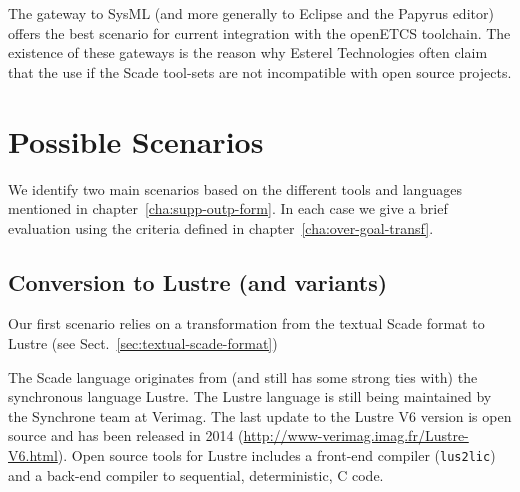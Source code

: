 \documentclass{template/openetcs_report}
\begin{document}
The gateway to SysML (and more generally to Eclipse and the Papyrus
editor) offers the best scenario for current integration with the
openETCS toolchain. The existence of these gateways is the reason why
Esterel Technologies often claim that the use if the Scade tool-sets
are not incompatible with open source projects.

\begin{center}
  \setlength{\fboxsep}{10pt}
\end{center}



\chapter{Possible Scenarios}
\label{cha:possible-scenarios}

We identify two main scenarios based on the different tools and
languages mentioned in chapter~\ref{cha:supp-outp-form}. In each case
we give a brief evaluation using the criteria defined in
chapter~\ref{cha:over-goal-transf}.

\section{Conversion to Lustre (and variants)}

Our first scenario relies on a transformation from the textual Scade
format to Lustre (see Sect.~\ref{sec:textual-scade-format})

The Scade language originates from (and still has some strong ties
with) the synchronous language Lustre. The Lustre language is still
being maintained by the Synchrone team at Verimag. The last update to
the Lustre V6 version is open source and has been released in 2014
(\url{http://www-verimag.imag.fr/Lustre-V6.html}). Open source tools
for Lustre includes a front-end compiler (\verb+lus2lic+) and a
back-end compiler to sequential, deterministic, C code.
\end{document}
